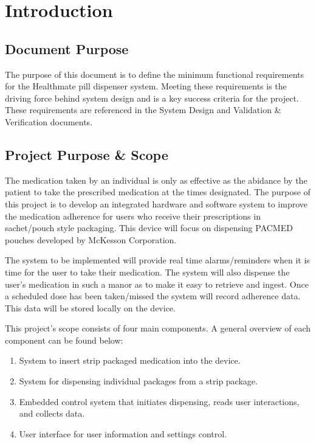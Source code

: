 \documentclass[12pt]{article}
\begin{document}
 
\pagebreak
\pagestyle{fancy} \fancyhf{}
  \cfoot{\thepage}


\pagebreak
\tableofcontents
\listoffigures
\listoftables
\pagebreak
{}


\section{Introduction}
\subsection{Document Purpose}
The purpose of this document is to define the minimum functional requirements for the Healthmate pill dispenser system. Meeting these requirements is the driving force behind system design and is a key success criteria for the project. These requirements are referenced in the System Design and Validation \& Verification documents.


\subsection{Project Purpose \& Scope}
The medication taken by an individual is only as effective as the abidance by the patient to take the prescribed medication at the times designated. The purpose of this project is to develop an integrated hardware and software system to improve the medication adherence for users who receive their prescriptions in sachet/pouch style packaging. This device will focus on dispensing PACMED pouches developed by McKesson Corporation. \par
The system to be implemented will provide real time alarms/reminders when it is time for the user to take their medication. The system will also dispense the user's medication in such a manor as to make it easy to retrieve and ingest. Once a scheduled dose has been taken/missed the system will record adherence data. This data will be stored locally on the device.\par
This project's scope consists of four main components. A general overview of each component can be found below:
\begin{enumerate}
    \item System to insert strip packaged medication into the device.
    \item System for dispensing individual packages from a strip package.
    \item Embedded control system that initiates dispensing, reads user interactions, and collects data.
    \item User interface for user information and settings control.
\end{enumerate}
\end{document}
